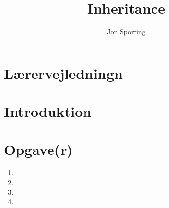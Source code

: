 \documentclass[a4paper,12pt]{article}
\title{Inheritance}
\author{Jon Sporring}
\begin{document}
\maketitle

\section{Lærervejledningn}

\section{Introduktion}

\section{Opgave(r)}
\begin{enumerate}
\item 
\item 
\item 
\item 
\end{enumerate}
\end{document}
